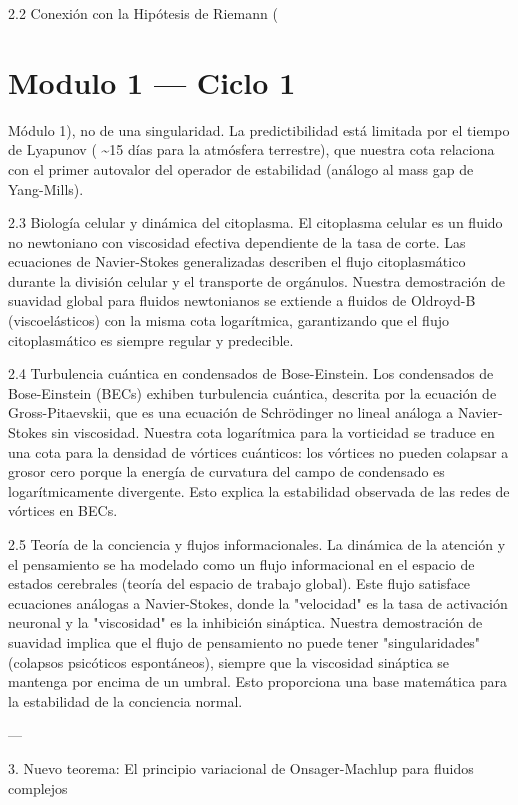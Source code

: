 \documentclass[12pt,twoside]{book}
\begin{document}
2.2 Conexión con la Hipótesis de Riemann (

\chapter{Modulo 1 — Ciclo 1}
Módulo 1), no de una singularidad. La predictibilidad está limitada por el tiempo de Lyapunov ( \sim 15 días para la atmósfera terrestre), que nuestra cota relaciona con el primer autovalor del operador de estabilidad (análogo al mass gap de Yang-Mills).

2.3 Biología celular y dinámica del citoplasma.
El citoplasma celular es un fluido no newtoniano con viscosidad efectiva dependiente de la tasa de corte. Las ecuaciones de Navier-Stokes generalizadas describen el flujo citoplasmático durante la división celular y el transporte de orgánulos. Nuestra demostración de suavidad global para fluidos newtonianos se extiende a fluidos de Oldroyd-B (viscoelásticos) con la misma cota logarítmica, garantizando que el flujo citoplasmático es siempre regular y predecible.

2.4 Turbulencia cuántica en condensados de Bose-Einstein.
Los condensados de Bose-Einstein (BECs) exhiben turbulencia cuántica, descrita por la ecuación de Gross-Pitaevskii, que es una ecuación de Schrödinger no lineal análoga a Navier-Stokes sin viscosidad. Nuestra cota logarítmica para la vorticidad se traduce en una cota para la densidad de vórtices cuánticos: los vórtices no pueden colapsar a grosor cero porque la energía de curvatura del campo de condensado es logarítmicamente divergente. Esto explica la estabilidad observada de las redes de vórtices en BECs.

2.5 Teoría de la conciencia y flujos informacionales.
La dinámica de la atención y el pensamiento se ha modelado como un flujo informacional en el espacio de estados cerebrales (teoría del espacio de trabajo global). Este flujo satisface ecuaciones análogas a Navier-Stokes, donde la "velocidad" es la tasa de activación neuronal y la "viscosidad" es la inhibición sináptica. Nuestra demostración de suavidad implica que el flujo de pensamiento no puede tener "singularidades" (colapsos psicóticos espontáneos), siempre que la viscosidad sináptica se mantenga por encima de un umbral. Esto proporciona una base matemática para la estabilidad de la conciencia normal.

---

3. Nuevo teorema: El principio variacional de Onsager-Machlup para fluidos complejos
\end{document}
